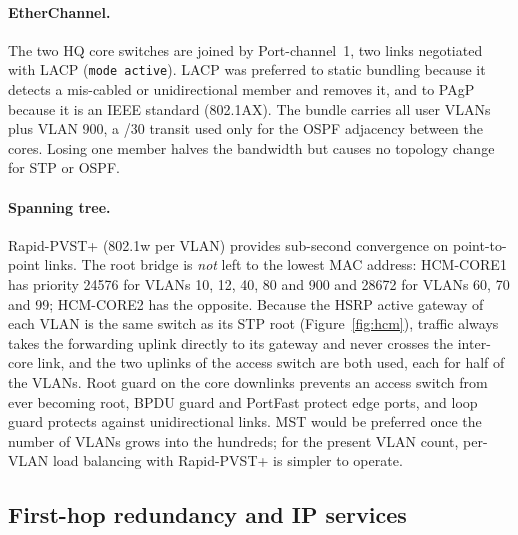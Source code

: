 \documentclass[11pt,a4paper]{article}
\begin{document}
\paragraph{EtherChannel.} The two HQ core switches are joined by Port-channel~1, two links negotiated with LACP (\texttt{mode active}). LACP was preferred to static bundling because it detects a mis-cabled or unidirectional member and removes it, and to PAgP because it is an IEEE standard (802.1AX). The bundle carries all user VLANs plus VLAN 900, a /30 transit used only for the OSPF adjacency between the cores. Losing one member halves the bandwidth but causes no topology change for STP or OSPF.



\paragraph{Spanning tree.} Rapid-PVST+ (802.1w per VLAN) provides sub-second convergence on point-to-point links. The root bridge is \emph{not} left to the lowest MAC address: HCM-CORE1 has priority 24576 for VLANs 10, 12, 40, 80 and 900 and 28672 for VLANs 60, 70 and 99; HCM-CORE2 has the opposite. Because the HSRP active gateway of each VLAN is the same switch as its STP root (Figure~\ref{fig:hcm}), traffic always takes the forwarding uplink directly to its gateway and never crosses the inter-core link, and the two uplinks of the access switch are both used, each for half of the VLANs. Root guard on the core downlinks prevents an access switch from ever becoming root, BPDU guard and PortFast protect edge ports, and loop guard protects against unidirectional links. MST would be preferred once the number of VLANs grows into the hundreds; for the present VLAN count, per-VLAN load balancing with Rapid-PVST+ is simpler to operate.



\subsection{First-hop redundancy and IP services}
\label{sec:fhrp}
\end{document}

